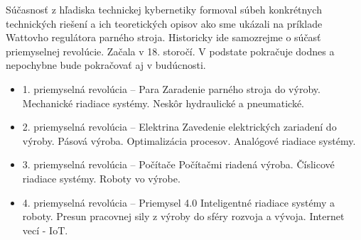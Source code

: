 \documentclass[a4paper, 10pt, ]{article}
\begin{document}
Súčasnosť z hľadiska technickej kybernetiky formoval súbeh konkrétnych technických riešení a ich teoretických opisov ako sme ukázali na príklade Wattovho regulátora parného stroja. Historicky ide samozrejme o súčasť priemyselnej revolúcie. Začala v 18. storočí. V podstate pokračuje dodnes a nepochybne bude pokračovať aj v budúcnosti. 



\begin{itemize}[leftmargin=0pt, labelsep=3mm, itemsep=0pt]
    \item 1. priemyselná revolúcia  -- Para \newline Zaradenie parného stroja do výroby. Mechanické riadiace systémy. Neskôr hydraulické a pneumatické.
    \item 2. priemyselná revolúcia  -- Elektrina \newline Zavedenie elektrických zariadení do výroby. Pásová výroba. Optimalizácia procesov. Analógové riadiace systémy.
    \item 3. priemyselná revolúcia  -- Počítače \newline Počítačmi riadená výroba. Číslicové riadiace systémy. Roboty vo výrobe.
    \item 4. priemyselná revolúcia  -- Priemysel 4.0 \newline Inteligentné riadiace systémy a roboty. Presun pracovnej sily z výroby do sféry rozvoja a vývoja. Internet vecí - IoT.
\end{itemize}
\end{document}

